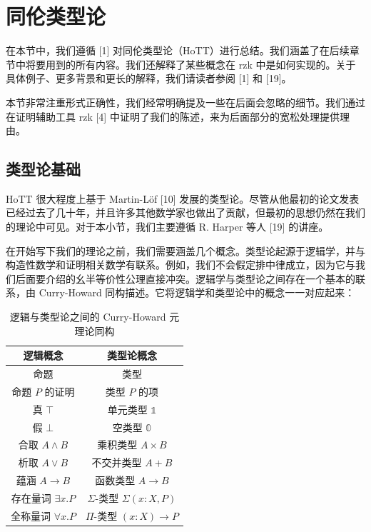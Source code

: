\documentclass{ctexrep}
\theoremstyle{plain}
\theoremstyle{definition}
\theoremstyle{remark}
\theoremstyle{definition}
\theoremstyle{definition}
\theoremstyle{definition}
\begin{document}
\chapter{同伦类型论}

在本节中，我们遵循 [1] 对同伦类型论（HoTT）进行总结。我们涵盖了在后续章节中将要用到的所有内容。我们还解释了某些概念在 \textsf{rzk} 中是如何实现的。关于具体例子、更多背景和更长的解释，我们请读者参阅 [1] 和 [19]。

本节非常注重形式正确性，我们经常明确提及一些在后面会忽略的细节。我们通过在证明辅助工具 \textsf{rzk} [4] 中证明了我们的陈述，来为后面部分的宽松处理提供理由。

\section{类型论基础}

HoTT 很大程度上基于 Martin-Löf [10] 发展的类型论。尽管从他最初的论文发表已经过去了几十年，并且许多其他数学家也做出了贡献，但最初的思想仍然在我们的理论中可见。对于本小节，我们主要遵循 R. Harper 等人 [19] 的讲座。

在开始写下我们的理论之前，我们需要涵盖几个概念。类型论起源于逻辑学，并与构造性数学和证明相关数学有联系。例如，我们不会假定排中律成立，因为它与我们后面要介绍的幺半等价性公理直接冲突。逻辑学与类型论之间存在一个基本的联系，由 Curry-Howard 同构描述。它将逻辑学和类型论中的概念一一对应起来：
\begin{table}[H]
\centering
\renewcommand{\arraystretch}{1.3} %
\begin{tabular}{|c|c|}
\hline
\textbf{逻辑概念} & \textbf{类型论概念} \\
\hline
命题 & 类型 \\
\hline
命题 $P$ 的证明 & 类型 $P$ 的项 \\
\hline
真 $\top$ & 单元类型 $\mathbb{1}$ \\
\hline
假 $\bot$ & 空类型 $\mathbb{0}$ \\
\hline
合取 $A \land B$ & 乘积类型 $A \times B$ \\
\hline
析取 $A \lor B$ & 不交并类型 $A + B$ \\
\hline
蕴涵 $A \to B$ & 函数类型 $A \to B$ \\
\hline
存在量词 $\exists x.P$ & $\Sigma$-类型 $\Sigma(x : X, P)$ \\
\hline
全称量词 $\forall x.P$ & $\Pi$-类型 $(x : X) \to P$ \\
\hline
\end{tabular}
\caption{逻辑与类型论之间的 Curry-Howard 元理论同构}
\end{table}
\end{document}
